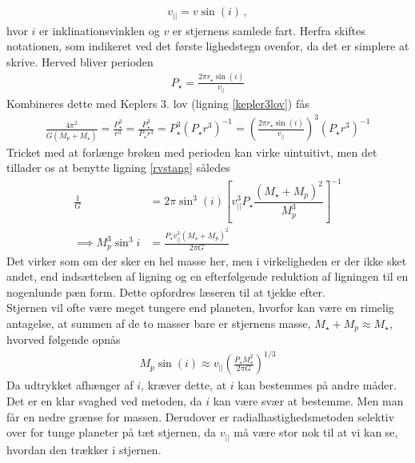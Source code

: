 \begin{align}
    v_{||} = v \sin(i) \, ,
\end{align}
hvor $i$ er inklinationsvinklen og $v$ er stjernens samlede fart. Herfra skiftes notationen, som indikeret ved det første lighedstegn ovenfor, da det er simplere at skrive. %
Herved bliver perioden
\begin{align}
    P_\star  = \frac{2\pi r_\star \sin(i)}{v_{||}} 
\end{align}
Kombineres dette med Keplers 3. lov (ligning \eqref{kepler3lov}) fås
\begin{align}
    \frac{4\pi^2}{G(M_p+M_\star )} = \frac{P_\star ^2}{r ^3} = \frac{P_\star ^3}{P_\star r ^3} = P_\star ^3 (P_\star r ^3)^{-1} = \left(\frac{2\pi r_\star \sin(i)}{v_{||}}\right)^3\left(P_\star r^3\right)^{-1}
\end{align}
Tricket med at forlænge brøken med perioden kan virke uintuitivt, men det tillader os at benytte ligning \eqref{rvstang} således
\begin{equation}
\begin{aligned}
    \frac{1}{G} &= 2\pi\sin^3(i)\left[v_{||}^3P_\star \dfrac{(M_\star +M_p)^2}{M_p^3}\right]^{-1} \\
    \implies M_p^3\sin^3i &= \frac{P_\star v_{||}^3(M_\star +M_p)^2}{2\pi G}
\end{aligned}
\end{equation}
Det virker som om der sker en hel masse her, men i virkeligheden er der ikke sket andet, end indsættelsen af ligning  og en efterfølgende reduktion af ligningen til en nogenlunde pæn form. Dette opfordres læseren til at tjekke efter. \\
Stjernen vil ofte være meget tungere end planeten, hvorfor kan være en rimelig antagelse, at summen af de to masser bare er stjernens masse, $M_\star  + M_p\approx M_\star $, hvorved følgende opnås
\begin{align}
    M_p\sin(i) \approx v_{||}\left(\frac{P_\star M_\star ^2}{2\pi G}\right)^{1/3}
\end{align}
Da udtrykket afhænger af $i$, kræver dette, at $i$ kan bestemmes på andre måder. Det er en klar svaghed ved metoden, da $i$ kan være svær at bestemme. Men man får en nedre grænse for massen. Derudover er radialhastighedsmetoden selektiv over for tunge planeter på tæt stjernen, da $v_{||}$ må være stor nok til at vi kan se, hvordan den trækker i stjernen.

